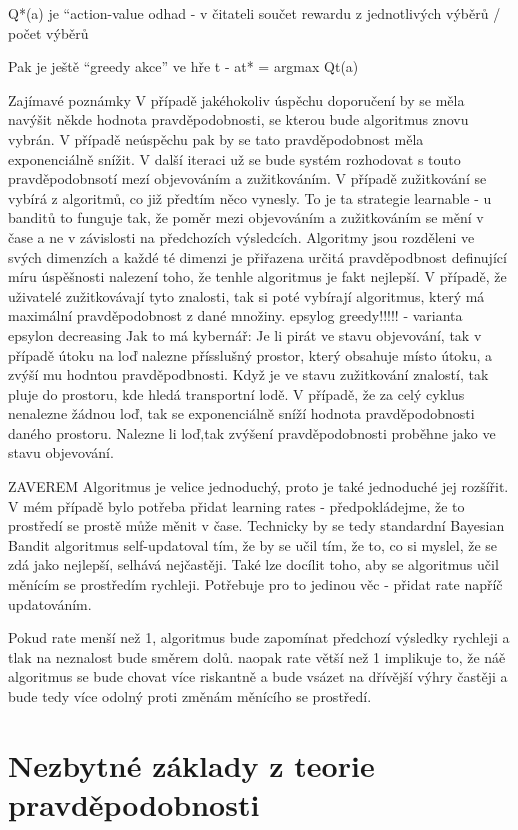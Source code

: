 \documentclass[thesis=M,czech]{FITthesis}[2014/05/07]
\begin{document}
Q*(a) je “action-value odhad - v čitateli součet rewardu z jednotlivých výběrů / počet výběrů

Pak je ještě “greedy akce” ve hře t - at* = argmax Qt(a) 

Zajímavé poznámky
V případě jakéhokoliv úspěchu doporučení by se měla navýšit někde hodnota pravděpodobnosti, se kterou bude algoritmus znovu vybrán. V případě neúspěchu pak by se tato pravděpodobnost měla exponenciálně snížit. V další iteraci už se bude systém rozhodovat s touto pravděpodobnsotí mezí objevováním a zužitkováním. V případě zužitkování se vybírá z algoritmů, co již předtím něco vynesly. To je ta strategie learnable - u banditů to funguje tak, že poměr mezi objevováním a zužitkováním se mění v čase a ne v závislosti na předchozích výsledcích. Algoritmy jsou rozděleni ve svých dimenzích a každé té dimenzi je přiřazena určitá pravděpodbnost definující míru úspěšnosti nalezení toho, že tenhle algoritmus je fakt nejlepší. V případě, že uživatelé zužitkovávají tyto znalosti, tak si poté vybírají algoritmus, který má maximální pravděpodobnost z dané množiny. 
epsylog greedy!!!!! - varianta  epsylon decreasing
Jak to má kybernář: Je li pirát ve stavu objevování, tak v případě útoku na loď nalezne přísslušný prostor, který obsahuje místo útoku, a zvýší mu hodntou pravděpodbnosti. Když je ve stavu zužitkování znalostí, tak pluje do prostoru, kde hledá transportní lodě. V případě, že za celý cyklus nenalezne žádnou loď, tak se exponenciálně sníží hodnota pravděpodobnosti daného prostoru. Nalezne li loď,tak zvýšení pravděpodobnosti proběhne jako ve stavu objevování. 


ZAVEREM
Algoritmus je velice jednoduchý, proto je také jednoduché jej rozšířit. V mém případě bylo potřeba přidat learning rates - předpokládejme, že to prostředí se prostě může měnit v čase. Technicky by se tedy standardní Bayesian Bandit algoritmus self-updatoval tím, že by se učil tím, že to, co si myslel, že se zdá jako nejlepší, selhává nejčastěji. Také lze docílit toho, aby se algoritmus učil měnícím se prostředím rychleji. Potřebuje pro to jedinou věc - přidat rate napříč updatováním.

Pokud rate menší než 1, algoritmus bude zapomínat předchozí výsledky rychleji a tlak na neznalost bude směrem dolů. naopak rate větší než 1 implikuje to, že náě algoritmus se bude chovat více riskantně a bude vsázet na dřívější výhry častěji a bude tedy více odolný proti změnám měnícího se prostředí.

\section{Nezbytné základy z teorie pravděpodobnosti}
\end{document}
